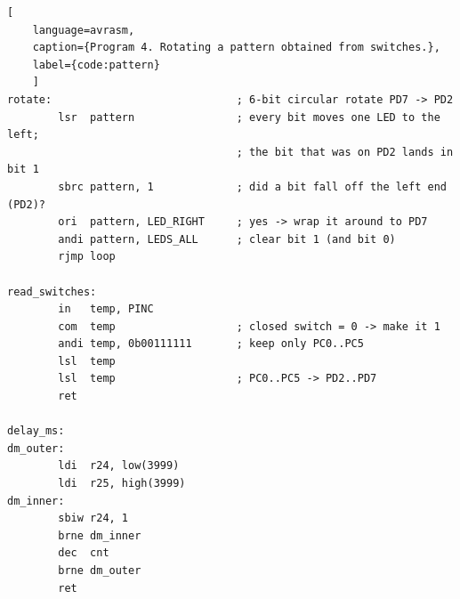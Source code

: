 \documentclass[11pt]{article}
\begin{document}
\begin{lstlisting}[
    language=avrasm,
    caption={Program 4. Rotating a pattern obtained from switches.},
    label={code:pattern}
    ]
rotate:                             ; 6-bit circular rotate PD7 -> PD2
        lsr  pattern                ; every bit moves one LED to the left;
                                    ; the bit that was on PD2 lands in bit 1
        sbrc pattern, 1             ; did a bit fall off the left end (PD2)?
        ori  pattern, LED_RIGHT     ; yes -> wrap it around to PD7
        andi pattern, LEDS_ALL      ; clear bit 1 (and bit 0)
        rjmp loop

read_switches:
        in   temp, PINC
        com  temp                   ; closed switch = 0 -> make it 1
        andi temp, 0b00111111       ; keep only PC0..PC5
        lsl  temp
        lsl  temp                   ; PC0..PC5 -> PD2..PD7
        ret

delay_ms:
dm_outer:
        ldi  r24, low(3999)
        ldi  r25, high(3999)
dm_inner:
        sbiw r24, 1
        brne dm_inner
        dec  cnt
        brne dm_outer
        ret
\end{lstlisting}
\end{document}
